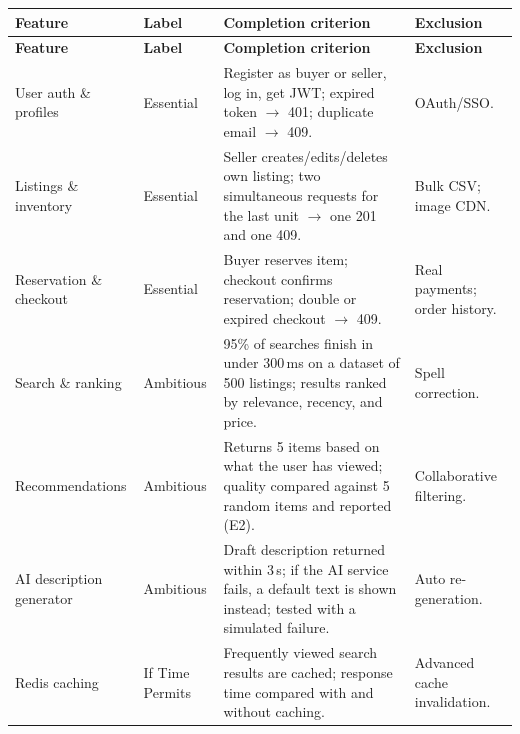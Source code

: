 \documentclass[11pt]{article}
\begin{document}
{\small
\begin{xltabular}{\linewidth}{@{}P{2.6cm}P{1.9cm}LP{2.6cm}@{}}
\toprule
\textbf{Feature} & \textbf{Label} & \textbf{Completion criterion} & \textbf{Exclusion} \\
\midrule
\endfirsthead
\toprule
\textbf{Feature} & \textbf{Label} & \textbf{Completion criterion} & \textbf{Exclusion} \\
\midrule
\endhead
User auth \& profiles & Essential & Register as buyer or seller, log in, get JWT; expired token $\rightarrow$ 401; duplicate email $\rightarrow$ 409. & OAuth/SSO. \\
Listings \& inventory & Essential & Seller creates/edits/deletes own listing; two simultaneous requests for the last unit $\rightarrow$ one 201 and one 409. & Bulk CSV; image CDN. \\
Reservation \& checkout & Essential & Buyer reserves item; checkout confirms reservation; double or expired checkout $\rightarrow$ 409. & Real payments; order history. \\
Search \& ranking & Ambitious & 95\% of searches finish in under 300\,ms on a dataset of 500 listings; results ranked by relevance, recency, and price. & Spell correction. \\
Recommendations & Ambitious & Returns 5 items based on what the user has viewed; quality compared against 5 random items and reported (E2). & Collaborative filtering. \\
AI description generator & Ambitious & Draft description returned within 3\,s; if the AI service fails, a default text is shown instead; tested with a simulated failure. & Auto re-generation. \\
Redis caching & If Time Permits & Frequently viewed search results are cached; response time compared with and without caching. & Advanced cache invalidation. \\
\bottomrule
\end{xltabular}}


\end{document}
